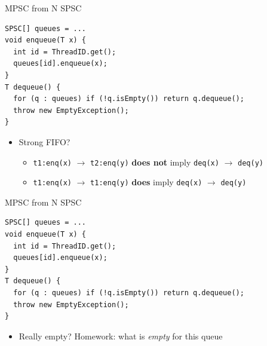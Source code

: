 \begin{frame}{MPSC from N SPSC}


\begin{verbatim}
SPSC[] queues = ...
void enqueue(T x) {
  int id = ThreadID.get();
  queues[id].enqueue(x);
}
T dequeue() {
  for (q : queues) if (!q.isEmpty()) return q.dequeue();
  throw new EmptyException();
}
\end{verbatim}

\begin{itemize}  
  \item Strong FIFO?
  \begin{itemize}
    \pause \item \texttt{t1:enq(x)} $\rightarrow$ \texttt{t2:enq(y)} \textbf{does not} imply \texttt{deq(x)} $\rightarrow$ \texttt{deq(y)}
    \pause \item \texttt{t1:enq(x)} $\rightarrow$ \texttt{t1:enq(y)} \textbf{does} imply \texttt{deq(x)} $\rightarrow$ \texttt{deq(y)}    
  \end{itemize}
\end{itemize}

\end{frame}

\begin{frame}{MPSC from N SPSC}


\begin{verbatim}
SPSC[] queues = ...
void enqueue(T x) {
  int id = ThreadID.get();
  queues[id].enqueue(x);
}
T dequeue() {
  for (q : queues) if (!q.isEmpty()) return q.dequeue();
  throw new EmptyException();
}
\end{verbatim}

\begin{itemize}  
  \item Really empty? \pause Homework: what is \textit{empty} for this queue  
\end{itemize}

\end{frame}

